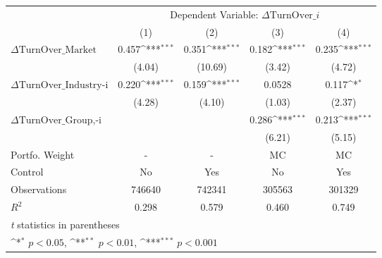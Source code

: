 {
\def\sym#1{\ifmmode^{#1}\else\(^{#1}\)\fi}
\begin{tabular}{l*{4}{c}}
\hline\hline
                    &\multicolumn{4}{c}{Dependent Variable: $\Delta \text{TurnOver}\_{i} $ }                 \\\cmidrule(lr){2-5}
                    &\multicolumn{1}{c}{(1)}         &\multicolumn{1}{c}{(2)}         &\multicolumn{1}{c}{(3)}         &\multicolumn{1}{c}{(4)}         \\
\hline
 $ \Delta \text{TurnOver}\_{\text{Market}} $ &       0.457\sym{***}&       0.351\sym{***}&       0.182\sym{***}&       0.235\sym{***}\\
                    &      (4.04)         &     (10.69)         &      (3.42)         &      (4.72)         \\
[1em]
 $ \Delta \text{TurnOver}\_{\text{Industry-i}} $ &       0.220\sym{***}&       0.159\sym{***}&      0.0528         &       0.117\sym{*}  \\
                    &      (4.28)         &      (4.10)         &      (1.03)         &      (2.37)         \\
[1em]
 $ \Delta \text{TurnOver}\_{\text{Group,-i}} $ &                     &                     &       0.286\sym{***}&       0.213\sym{***}\\
                    &                     &                     &      (6.21)         &      (5.15)         \\
\hline
Portfo. Weight      &           -         &           -         & $ \text{MC} $          & $ \text{MC} $          \\
Control             &          No         &         Yes         &          No         &         Yes         \\
Observations        &      746640         &      742341         &      305563         &      301329         \\
$ R^2 $             &       0.298         &       0.579         &       0.460         &       0.749         \\
\hline\hline
\multicolumn{5}{l}{\footnotesize \textit{t} statistics in parentheses}\\
\multicolumn{5}{l}{\footnotesize \sym{*} \(p<0.05\), \sym{**} \(p<0.01\), \sym{***} \(p<0.001\)}\\
\end{tabular}
}
